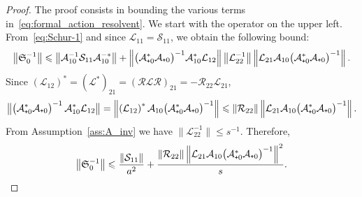 \documentclass[AHL,Unicode,longabstracts,MathTools,published]{cedram}
\newcommand{\cL}{\mathcal{L}}
\newcommand{\cLs}{\mathcal{S}}
\newcommand{\cLa}{\mathcal{A}}
\newcommand{\cR}{\mathcal{R}}
\newcommand{\Schur}{\mathfrak{S}_0}
\newcommand{\subplus}{\textnormal{\texttt{+}}}
\renewcommand{\leq}{\leqslant}
\renewcommand{\le}{\leqslant}
\begin{document}
\begin{proof}
The proof consists in bounding the various terms in~\eqref{eq:formal_action_resolvent}. We start with the operator on the upper left. From~\eqref{eq:Schur-1} and since $\cL_{11} = \cLs_{11}$, we obtain the following bound:
\[
\left\|\Schur^{-1}\right\| \le \left\|\cLa_{10}^{-1} \cLs_{11} \cLa_{10}^{-*}\right\| + \left\|\big(\cLa_{\subplus0}^*\cLa_{\subplus0}\big)^{-1} \cLa_{10}^{*}\cL_{12} \right\|\left\|\cL_{22}^{-1} \right\|\left\|\cL_{21} \cLa_{10} \big(\cLa_{\subplus0}^*\cLa_{\subplus0}\big)^{-1}\right\|.
\]
Since $(\cL_{12})^{*} = (\cL^{*})_{21} = (\cR \cL \cR)_{21} = -\cR_{22} \cL_{21}$,
\[
\left\|\big(\cLa_{\subplus0}^*\cLa_{\subplus0}\right)^{-1} \cLa_{10}^{*}\cL_{12} \big\| = \left\|\left(\cL_{12}\right)^* \cLa_{10} \big(\cLa_{\subplus0}^*\cLa_{\subplus0}\big)^{-1} \right\|
\leq \|\cR_{22}\|\left\|\cL_{21} \cLa_{10} \big(\cLa_{\subplus0}^*\cLa_{\subplus0}\big)^{-1}\right\|.
\]
From Assumption~\ref{ass:A_inv} we have $\|\cL_{22}^{-1}\| \leq s^{-1}$. Therefore,
\begin{equation}\label{eq:Schur_inv_bound}
\left\|\Schur^{-1}\right\| \le \frac {\left\|\cLs_{11}\right\|} {a^{2}} + \frac {\left\|\cR_{22}\right\|\left\|\cL_{21} \cLa_{10}\big(\cLa_{\subplus0}^{*}\cLa_{\subplus0}\big)^{-1}\right\|^{2}}{s}.
\end{equation}


\end{proof}
\end{document}
